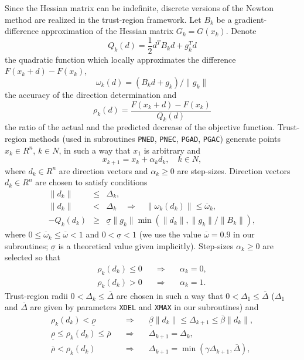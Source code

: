 \documentclass{esub2acm}
\begin{document}
Since the Hessian matrix can be indefinite, discrete versions of the Newton
method are realized in the trust-region framework. Let $B_k$ be a
gradient-difference approximation of the Hessian matrix $G_k = G(x_k)$.
Denote
%
$$Q_k(d) = \frac{1}{2} d^T B_k d + g_k^T d$$
%
the quadratic function which locally approximates the difference
$F(x_k + d)-F(x_k)$,
%
$$\omega_k (d) = (B_k d + g_k) / \| g_k \|$$
%
the accuracy of the direction determination and
%
$$\rho_k (d) = \frac{F(x_k + d) - F(x_k)}{Q_k (d)}$$
%
the ratio of the actual and the predicted decrease of the objective function.
Trust-region methods (used in subroutines {\tt PNED}, {\tt PNEC},
{\tt PGAD}, {\tt PGAC}) generate points $x_k \in R^n$, $k \in N$,
in such a way that $x_1$ is arbitrary and
%
\begin{equation}
\label{31}
x_{k+1} = x_k + \alpha_k d_k, \quad k \in N,
\end{equation}
%
where $d_k \in R^n$ are direction vectors and $\alpha_k \geq 0$ are
step-sizes. Direction vectors $d_k \in R^n$ are chosen to satisfy
conditions
%
\begin{eqnarray}
\label{32a}
\| d_k \| & \leq & \Delta_k,\\
\label{32b}
\| d_k \| & < & \Delta_k \quad \Rightarrow \quad \| \omega_k(d_k) \| \leq
\overline{\omega}_k,\\
\label{32c}
-Q_k(d_k) & \geq & \underline{\sigma} \| g_k \|
\min(\| d_k \|,\| g_k \| / \| B_k \|),
\end{eqnarray}
%
where $0 \leq \overline{\omega}_k \leq \overline{\omega} < 1$ and
$0 < \underline{\sigma} < 1$ (we use the value $\overline{\omega} = 0.9$
in our subroutines; $\underline{\sigma}$ is a theoretical value
given implicitly). Step-sizes $\alpha_k \geq 0$ are
selected so that
%
\begin{eqnarray}
\label{33a}
\rho_k(d_k) \leq 0 \quad & \Rightarrow & \quad \alpha_k = 0,\\
\label{33b}
\rho_k(d_k) > 0 \quad & \Rightarrow & \quad \alpha_k = 1.
\end{eqnarray}
%
Trust-region radii $0 < \Delta_k \leq \overline{\Delta}$
are chosen in such a way that $0 < \Delta_1 \leq \overline{\Delta}$
($\Delta_1$ and $\overline{\Delta}$ are given by parameters
{\tt XDEL} and {\tt XMAX} in our subroutines) and
%
\begin{eqnarray}
\label{44a}
\rho_k(d_k) < \underline{\rho} \quad & \Rightarrow & \quad
\underline{\beta} \| d_k \| \leq \Delta_{k+1} \leq
\overline{\beta} \| d_k \|,\\
\label{44b}
\underline{\rho} \leq \rho_k(d_k) \leq \overline{\rho} \quad & \Rightarrow & \quad
\Delta_{k+1} = \Delta_k, \\
\label{44c}
\overline{\rho} < \rho_k(d_k) \quad & \Rightarrow & \quad
\Delta_{k+1} = \min (\gamma \Delta_{k+1}, \overline{\Delta}),
\end{eqnarray}
\end{document}
